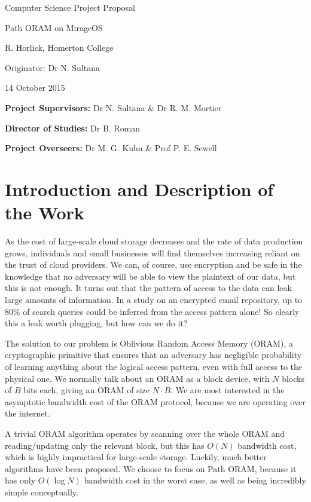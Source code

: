 \documentclass[12pt,a4paper,twoside]{article}
\begin{document}
\vfil

\centerline{\Large Computer Science Project Proposal}
\vspace{0.4in}
\centerline{\Large Path ORAM on MirageOS}
\vspace{0.4in}
\centerline{\large R. Horlick, Homerton College}
\vspace{0.3in}
\centerline{\large Originator: Dr N. Sultana}
\vspace{0.3in}
\centerline{\large 14 October 2015}

\vfil


\noindent
{\bf Project Supervisors:} Dr N. Sultana \& Dr R. M. Mortier
\vspace{0.2in}

\noindent
{\bf Director of Studies:} Dr B. Roman
\vspace{0.2in}
\noindent
 
\noindent
{\bf Project Overseers:} Dr M. G. Kuhn \& Prof P. E. Sewell



\section*{Introduction and Description of the Work}

As the cost of large-scale cloud storage decreases and the rate of data production grows, individuals and small businesses will find themselves increasing reliant on the trust of cloud providers. We can, of course, use encryption and be safe in the knowledge that no adversary will be able to view the plaintext of our data, but this is not enough. It turns out that the pattern of access to the data can leak large amounts of information. In a study on an encrypted email repository, up to 80\% of search queries could be inferred from the access pattern alone! So clearly this a leak worth plugging, but how can we do it?

The solution to our problem is Oblivious Random Access Memory (ORAM), a cryptographic primitive that ensures that an adversary has negligible probability of learning anything about the logical access pattern, even with full access to the physical one. We normally talk about an ORAM as a block device, with $N$ blocks of $B$ bits each, giving an ORAM of size $N \cdot B$. We are most interested in the asymptotic bandwidth cost of the ORAM protocol, because we are operating over the internet.

A trivial ORAM algorithm operates by scanning over the whole ORAM and reading/updating only the relevant block, but this has $O(N)$ bandwidth cost, which is highly impractical for large-scale storage. Luckily, much better algorithms have been proposed. We choose to focus on Path ORAM, because it has only $O(\log N)$ bandwidth cost in the worst case, as well as being incredibly simple conceptually.
\end{document}
